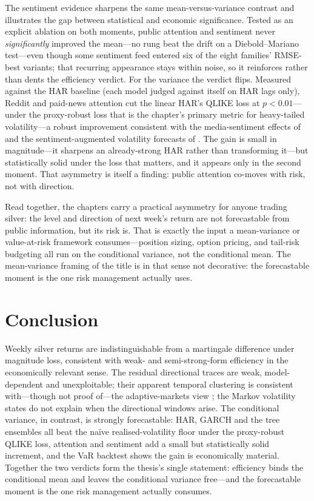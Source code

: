 \documentclass[12pt, a4paper]{article}
\begin{document}
The sentiment evidence sharpens the same mean-versus-variance contrast and illustrates the gap
between statistical and economic significance. Tested as an explicit ablation on both moments, 
public attention and sentiment never \emph{significantly} improved the mean---no rung beat the drift on a
Diebold--Mariano test---even though some sentiment feed entered six of the eight families'
RMSE-best variants; that recurring appearance stays within noise, so it reinforces rather than
dents the efficiency verdict. For the variance the verdict flips. Measured against the HAR
baseline (each model judged against itself on HAR lags only), Reddit and paid-news attention cut
the linear HAR's QLIKE loss at \(p<0.01\)---under the proxy-robust loss that is the chapter's
primary metric for heavy-tailed volatility---a robust improvement consistent with the
media-sentiment effects of \textcite{tetlock2007} and the sentiment-augmented volatility
forecasts of \textcite{audrino2020}. The gain is small in magnitude---it sharpens an
already-strong HAR rather than transforming it---but statistically solid under the loss that
matters, and it appears only in the second moment. That asymmetry is itself a finding: public
attention co-moves with risk, not with direction.

Read together, the chapters carry a practical asymmetry for anyone trading silver: the level and
direction of next week's return are not forecastable from public information, but its risk is.
That is exactly the input a mean-variance or value-at-risk framework consumes---position sizing,
option pricing, and tail-risk budgeting all run on the conditional variance, not the conditional
mean. The mean-variance framing of the title is in that sense not decorative: the forecastable
moment is the one risk management actually uses.

\section{Conclusion}
\label{sec:conclusion}

Weekly silver returns are indistinguishable from a martingale difference under magnitude
loss, consistent with weak- and semi-strong-form efficiency in the economically relevant
sense. The residual directional traces are weak, model-dependent and unexploitable; their
apparent temporal clustering is consistent with---though not proof of---the adaptive-markets
view \parencite{lo2004}; the Markov volatility states do not explain when the directional
windows arise. The conditional variance, in contrast, is strongly forecastable: HAR, GARCH
and the tree ensembles all beat the na\"ive realised-volatility floor under the
proxy-robust QLIKE loss, attention and sentiment add a small but statistically solid
increment, and the VaR backtest shows the gain is economically material. Together the two
verdicts form the thesis's single statement: efficiency binds the conditional mean and
leaves the conditional variance free---and the forecastable moment is the one risk
management actually consumes.
\end{document}
